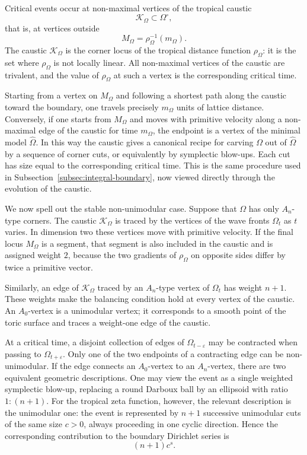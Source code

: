\documentclass[a4paper,american,11pt]{amsart}
\theoremstyle{plain}
\theoremstyle{definition}
\begin{document}
Critical events occur at non-maximal vertices of the tropical caustic
\[
\mathcal K_\Omega\subset\Omega^\circ,
\]
that is, at vertices outside
\[
M_\Omega=\rho_\Omega^{-1}(m_\Omega).
\]
The caustic \(\mathcal K_\Omega\) is the corner locus of the tropical distance
function \(\rho_\Omega\): it is the set where \(\rho_\Omega\) is not locally
linear.  All non-maximal vertices of the caustic are trivalent, and the value
of \(\rho_\Omega\) at such a vertex is the corresponding critical time.

Starting from a vertex on \(M_\Omega\) and following a shortest path along
the caustic toward the boundary, one travels precisely \(m_\Omega\) units of
lattice distance.  Conversely, if one starts from \(M_\Omega\) and moves with
primitive velocity along a non-maximal edge of the caustic for time
\(m_\Omega\), the endpoint is a vertex of the minimal model
\(\widehat\Omega\).  In this way the caustic gives a canonical recipe for
carving \(\Omega\) out of \(\widehat\Omega\) by a sequence of corner cuts, or
equivalently by symplectic blow-ups.  Each cut has size equal to the
corresponding critical time.  This is the same procedure used in
Subsection~\ref{subsec:integral-boundary}, now viewed directly through the
evolution of the caustic.

We now spell out the stable non-unimodular case.  Suppose that \(\Omega\)
has only \(A_n\)-type corners.  The caustic \(\mathcal K_\Omega\) is traced
by the vertices of the wave fronts \(\Omega_t\) as \(t\) varies.  In dimension
two these vertices move with primitive velocity.  If the final locus
\(M_\Omega\) is a segment, that segment is also included in the caustic and
is assigned weight \(2\), because the two gradients of \(\rho_\Omega\) on
opposite sides differ by twice a primitive vector.

Similarly, an edge of \(\mathcal K_\Omega\) traced by an \(A_n\)-type vertex
of \(\Omega_t\) has weight \(n+1\).  These weights make the balancing
condition hold at every vertex of the caustic.  An \(A_0\)-vertex is a
unimodular vertex; it corresponds to a smooth point of the toric surface and
traces a weight-one edge of the caustic.

At a critical time, a disjoint collection of edges of \(\Omega_{t-\varepsilon}\)
may be contracted when passing to \(\Omega_{t+\varepsilon}\).  Only one of
the two endpoints of a contracting edge can be non-unimodular.  If the edge
connects an \(A_0\)-vertex to an \(A_n\)-vertex, there are two equivalent
geometric descriptions.  One may view the event as a single weighted
symplectic blow-up, replacing a round Darboux ball by an ellipsoid with ratio
\(1:(n+1)\).  For the tropical zeta function, however, the relevant
description is the unimodular one: the event is represented by \(n+1\)
successive unimodular cuts of the same size \(c>0\), always proceeding in
one cyclic direction.  Hence the corresponding contribution to the boundary
Dirichlet series is
\[
(n+1)c^s.
\]
\end{document}
